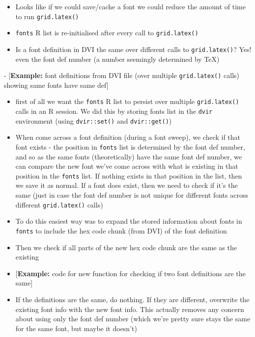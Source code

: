 \documentclass[]{article}
\begin{document}
\begin{itemize}
\item
  Looks like if we could save/cache a font we could reduce the amount of
  time to run \texttt{grid.latex()}
\item
  \texttt{fonts} R list is re-initialised after every call to
  \texttt{grid.latex()}
\item
  Is a font definition in DVI the same over different calls to
  \texttt{grid.latex()}? Yes! even the font def number (a number
  seemingly determined by TeX)
\end{itemize}

- {[}\textbf{Example:} font definitions from DVI file (over multiple
\texttt{grid.latex()} calls) showing same fonts have same def{]}

\begin{itemize}
\item
  first of all we want the \texttt{fonts} R list to persist over
  multiple \texttt{grid.latex()} calls in an R session. We did this by
  storing fonts list in the \texttt{dvir} environment (using
  \texttt{dvir::set()} and \texttt{dvir::get()})
\item
  When come across a font definition (during a font sweep), we check if
  that font exists - the position in \texttt{fonts} list is determined
  by the font def number, and so as the same fonts (theoretically) have
  the same font def number, we can compare the new font we've come
  across with what is existing in that position in the \texttt{fonts}
  list. If nothing exists in that position in the list, then we save it
  as normal. If a font does exist, then we need to check if it's the
  same (just in case the font def number is not unique for different
  fonts across different \texttt{grid.latex()} calls)
\item
  To do this easiest way was to expand the stored information about
  fonts in \texttt{fonts} to include the hex code chunk (from DVI) of
  the font definition
\item
  Then we check if all parts of the new hex code chunk are the same as
  the existing
\item
  {[}\textbf{Example:} code for new function for checking if two font
  definitions are the same{]}
\item
  If the definitions are the same, do nothing. If they are different,
  overwrite the existing font info with the new font info. This actually
  removes any concern about using only the font def number (which we're
  pretty sure stays the same for the same font, but maybe it doesn't)

\end{itemize}
\end{document}
